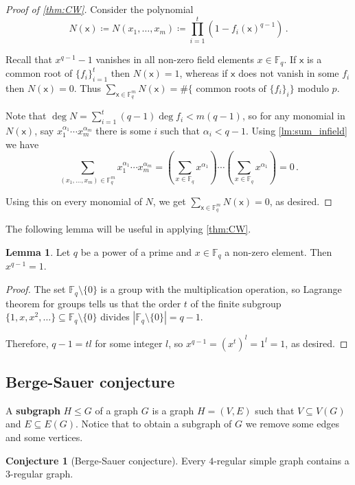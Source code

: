 \documentclass[12pt]{amsart}
\theoremstyle{definition}
\newtheorem{lm}[thm]{Lemma}
\newtheorem{conj}[thm]{Conjecture}
\newcommand{\F}{\mathbb{F}}
\newcommand{\vx}{\mathsf{x}}
\begin{document}
\begin{proof}[Proof of \cref{thm:CW}]
Consider the polynomial 
$$ N(\vx) \coloneqq N(x_1, \ldots, x_m ) \coloneqq \prod_{i=1}^t ( 1 - f_i(\vx )^{q-1} )\, . $$

Recall that $x^{q-1} - 1 $ vanishes in all non-zero field elements $x \in \F_q$.
If $\vx  $ is a common root of $\{f_i\}_{i=1}^t$ then $N(\vx) = 1$, whereas if $\vx $ does not vanish in some $f_i$ then $N(\vx) = 0$.
Thus $\sum_{\vx \in \F_q^m} N(\vx) = \# \{ \text{ common roots of } \{f_i\}_i \}$ modulo $p$.

Note that $\deg N = \sum_{i= 1}^t (q-1)\deg f_i < m(q-1)$, so for any monomial in $N(\vx )$, say $ x_1^{\alpha_1}\cdots x_m^{\alpha_m}$ there is some $i$ such that $\alpha_i < q-1$.
Using \cref{lm:sum_infield} we have 
$$\sum_{(x_1, \ldots, x_m) \in \F_q^m} x_1^{\alpha_1}\cdots x_m^{\alpha_m} = \left(\sum_{x\in\F_q}x^{\alpha_1} \right) \cdots \left(\sum_{x\in\F_q}x^{\alpha_1} \right) = 0\, . $$

Using this on every monomial of $N$, we get $\sum_{\vx \in \F_q^m} N(\vx) = 0$, as desired.
\end{proof}

The following lemma will be useful in applying \cref{thm:CW}.

\begin{lm}\label{lm:power}
Let $q$ be a power of a prime and $x \in \F_q$ a non-zero element.
Then $x^ {q-1} = 1 $.
\end{lm}

\begin{proof}
The set $\F_q\setminus \{0\}$ is a group with the multiplication operation, so Lagrange theorem for groups tells us that the order $t$ of the finite subgroup $\{1, x, x^2, \ldots \} \subseteq \F_q\setminus\{0\} $ divides $|\F_q\setminus \{0\}| = q-1$.

Therefore, $q-1 = tl $ for some integer $l$, so $x^{q-1} = (x^t)^l = 1^l = 1$, as desired.
\end{proof}

\subsection{Berge-Sauer conjecture}

A \textbf{subgraph} $H\leq G$ of a graph $G$ is a graph $H = (V, E)$ such that $V \subseteq V(G)$ and $E \subseteq E(G) $.
Notice that to obtain a subgraph of $G$ we remove some edges and some vertices.

\begin{conj}[Berge-Sauer conjecture]
Every $4$-regular simple graph contains a $3$-regular graph.
\end{conj}
\end{document}
